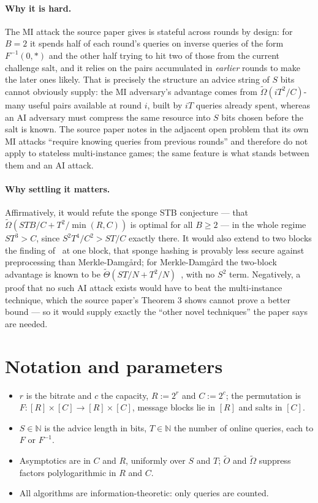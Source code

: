 \documentclass{aicr-conjecture}
\newcommand{\tO}{\tilde{O}}
\newcommand{\tOm}{\tilde{\Omega}}
\begin{document}
\paragraph{Why it is hard.}
The MI attack the source paper gives is stateful across rounds by
design: for $B = 2$ it spends half of each round's queries on inverse
queries of the form $F^{-1}(0,\ast)$ and the other half trying to hit
two of those from the current challenge salt, and it relies on the
pairs accumulated in \emph{earlier} rounds to make the later ones
likely. That is precisely the structure an advice string of $S$ bits
cannot obviously supply: the MI adversary's advantage comes from
$\tOm(i T^{2}/C)$-many useful pairs available at round $i$, built by
$iT$ queries already spent, whereas an AI adversary must compress the
same resource into $S$ bits chosen before the salt is known. The source
paper notes in the adjacent open problem that its own MI attacks
``require knowing queries from previous rounds'' and therefore do not
apply to stateless multi-instance games; the same feature is what
stands between them and an AI attack.

\paragraph{Why settling it matters.}
Affirmatively, it would refute the sponge STB conjecture --- that
$\tOm(STB/C + T^{2}/\min(R,C))$ is optimal for all $B \ge 2$ --- in
the whole regime $ST^{3} > C$, since $S^{2}T^{4}/C^{2} > ST/C$ exactly
there. It would also extend to two blocks the finding
of~\cite{FGK22} at one block, that sponge hashing is provably less
secure against preprocessing than Merkle-Damg\aa{}rd; for
Merkle-Damg\aa{}rd the two-block advantage is known to be
$\tilde{\Theta}(ST/N + T^{2}/N)$~\cite{ACDW20,AGL22}, with no
$S^{2}$ term. Negatively, a proof that no such AI attack exists would
have to beat the multi-instance technique, which the source paper's
Theorem 3 shows cannot prove a better bound --- so it would supply
exactly the ``other novel techniques'' the paper says are needed.

\section{Notation and parameters}\label{sec:notation}

\begin{itemize}
\item $r$ is the bitrate and $c$ the capacity, $R := 2^{r}$ and
  $C := 2^{c}$; the permutation is
  $F : [R] \times [C] \to [R] \times [C]$, message blocks lie in $[R]$
  and salts in $[C]$.
\item $S \in \mathbb{N}$ is the advice length in bits, $T \in
  \mathbb{N}$ the number of online queries, each to $F$ or $F^{-1}$.
\item Asymptotics are in $C$ and $R$, uniformly over $S$ and $T$;
  $\tO$ and $\tOm$ suppress factors polylogarithmic in $R$ and $C$.
\item All algorithms are information-theoretic: only queries are
  counted.
\end{itemize}
\end{document}
